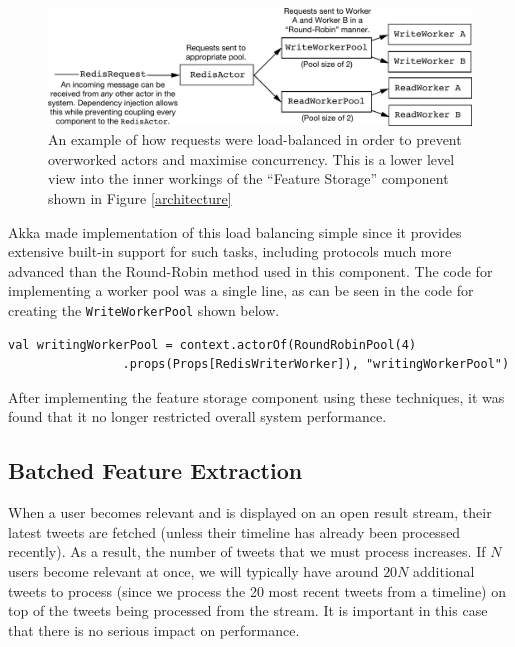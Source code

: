 \documentclass{l4proj}
\newcommand{\code}[1]{\texttt{#1}}
\begin{document}
\begin{figure}
\centering
\includegraphics[scale=0.7]{loadbalancing.pdf}
\caption{An example of how requests were load-balanced in order to prevent overworked actors and maximise concurrency. This is a lower level view into the inner workings of the ``Feature Storage'' component shown in Figure \ref{architecture}}
\label{loadbalancing}
\end{figure}
        
        Akka made implementation of this load balancing simple since it provides extensive built-in support for such tasks, including protocols much more advanced than the Round-Robin method used in this component. The code for implementing a worker pool was a single line, as can be seen in the code for creating the \code{WriteWorkerPool} shown below.
        
        \begin{lstlisting}[caption=Creating an actor pool to reduce the work required by any single actor.]
          val writingWorkerPool = context.actorOf(RoundRobinPool(4)
                .props(Props[RedisWriterWorker]), "writingWorkerPool")
        \end{lstlisting}

        
        After implementing the feature storage component using these techniques, it was found that it no longer restricted overall system performance.
        
        \subsection{Batched Feature Extraction}
        When a user becomes relevant and is displayed on an open result stream, their latest tweets are fetched (unless their timeline has already been processed recently). As a result, the number of tweets that we must process increases. If $N$ users become relevant at once, we will typically have around $20N$ additional tweets to process  (since we process the 20 most recent tweets from a timeline) on top of the tweets being processed from the stream. It is important in this case that there is no serious impact on performance.
        
\end{document}
